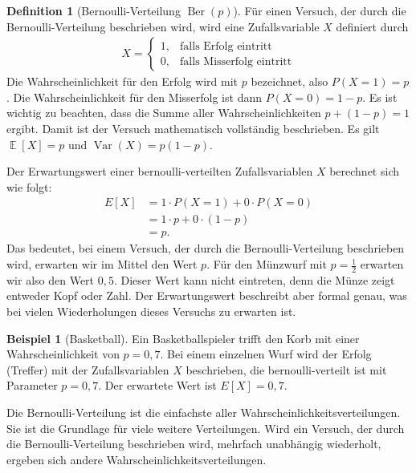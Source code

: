 ﻿\documentclass[12pt,a4paper]{article}
\theoremstyle{definition}
\newtheorem{definition}{Definition}[section]
\newtheorem{beispiel}{Beispiel}[section]
\theoremstyle{plain}
\theoremstyle{remark}
\DeclareMathOperator{\E}{\mathbb{E}}
\DeclareMathOperator{\Var}{Var}
\begin{document}
\begin{definition}[Bernoulli-Verteilung $\operatorname{Ber}(p)$]\label{def:bernoulli}
  Für einen Versuch, der durch die Bernoulli-Verteilung beschrieben wird,
  wird eine Zufallsvariable $X$ definiert durch
  \begin{align}
    X =
    \begin{cases}
      1, & \text{falls Erfolg eintritt} \\
      0, & \text{falls Misserfolg eintritt}
    \end{cases}
  \end{align}
  Die Wahrscheinlichkeit für den Erfolg wird mit $p$ bezeichnet, also
  $P(X = 1) = p$. Die Wahrscheinlichkeit für den Misserfolg ist dann
  $P(X = 0) = 1 - p$. Es ist wichtig zu beachten, dass die Summe aller
  Wahrscheinlichkeiten $p + (1-p) = 1$ ergibt. Damit ist der Versuch
  mathematisch vollständig beschrieben. Es gilt
  $\E[X] = p$ und $\Var(X) = p(1-p)$.
\end{definition}

Der Erwartungswert einer bernoulli-verteilten Zufallsvariablen $X$ berechnet
sich wie folgt:
\begin{align}
  E[X] &= 1 \cdot P(X = 1) + 0 \cdot P(X = 0) \\
       &= 1 \cdot p + 0 \cdot (1-p) \\
       &= p.
\end{align}
Das bedeutet, bei einem Versuch, der durch die Bernoulli-Verteilung beschrieben
wird, erwarten wir im Mittel den Wert $p$. Für den Münzwurf mit
$p = \frac{1}{2}$ erwarten wir also den Wert $0{,}5$. Dieser Wert kann nicht
eintreten, denn die Münze zeigt entweder Kopf oder Zahl. Der Erwartungswert
beschreibt aber formal genau, was bei vielen Wiederholungen dieses Versuchs
zu erwarten ist.

\begin{beispiel}[Basketball]\label{bsp:basketball}
  Ein Basketballspieler trifft den Korb mit einer Wahrscheinlichkeit von
  $p = 0{,}7$. Bei einem einzelnen Wurf wird der Erfolg (Treffer) mit der
  Zufallsvariablen $X$ beschrieben, die bernoulli-verteilt ist mit Parameter
  $p = 0{,}7$. Der erwartete Wert ist $E[X] = 0{,}7$.
\end{beispiel}

Die Bernoulli-Verteilung ist die einfachste aller Wahrscheinlichkeitsverteilungen.
Sie ist die Grundlage für viele weitere Verteilungen. Wird ein Versuch, der
durch die Bernoulli-Verteilung beschrieben wird, mehrfach unabhängig
wiederholt, ergeben sich andere Wahrscheinlichkeitsverteilungen.
\end{document}
